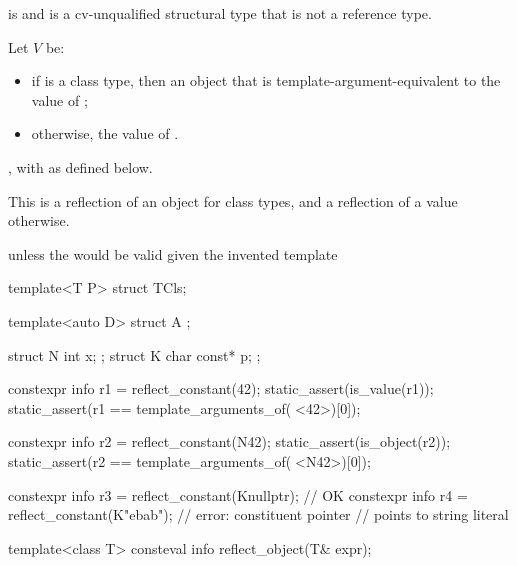 \begin{itemdescr}
\pnum
\mandates
{} is 
and  is a cv-unqualified structural type
that is not a reference type.

\pnum
Let $V$ be:
\begin{itemize}
\item
  if  is a class type,
  then an object that is template-argument-equivalent to the value of ;
\item
  otherwise, the value of .
\end{itemize}

\pnum
\returns
{},
with  as defined below.
\begin{note}
This is a reflection of an object for class types,
and a reflection of a value otherwise.
\end{note}

\pnum
\throws
{} unless
the   would be valid
given the invented template
\begin{codeblock}
template<T P> struct TCls;
\end{codeblock}

\pnum
\begin{example}
\begin{codeblock}
template<auto D>
  struct A { };

struct N { int x; };
struct K { char const* p; };

constexpr info r1 = reflect_constant(42);
static_assert(is_value(r1));
static_assert(r1 == template_arguments_of(^^A<42>)[0]);

constexpr info r2 = reflect_constant(N{42});
static_assert(is_object(r2));
static_assert(r2 == template_arguments_of(^^A<N{42}>)[0]);

constexpr info r3 = reflect_constant(K{nullptr});   // OK
constexpr info r4 = reflect_constant(K{"ebab"});    // error: constituent pointer
                                                    // points to string literal
\end{codeblock}
\end{example}
\end{itemdescr}

%
\begin{itemdecl}
template<class T>
  consteval info reflect_object(T& expr);
\end{itemdecl}

